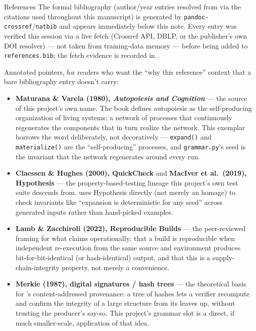 \documentclass[
  ignorenonframetext,
]{beamer}
\author{\texorpdfstring{}{}}
\date{}
\providecommand{\tightlist}{%
  \setlength{\itemsep}{0pt}\setlength{\parskip}{0pt}}
\begin{document}
\begin{frame}{References}
\protect{}\label{references}
The formal bibliography (author/year entries resolved from
 via the \texttt{\breakseq{[@citekey]}}
citations used throughout this manuscript) is generated by
\texttt{pandoc-crossref}/\texttt{natbib} and appears immediately below
this note. Every entry was verified this session via a live fetch
(Crossref API, DBLP, or the publisher's own DOI resolver) --- not taken
from training-data memory --- before being added to
\texttt{references.bib}; the fetch evidence is recorded in
.

Annotated pointers, for readers who want the ``why this reference''
context that a bare bibliography entry doesn't carry:

\begin{itemize}
\tightlist
\item
  \textbf{Maturana \& Varela (1980), \emph{Autopoiesis and Cognition}}
   --- the source of this project's own
  name. The book defines autopoiesis as the self-producing organization
  of living systems: a network of processes that continuously
  regenerates the components that in turn realize the network. This
  exemplar borrows the word deliberately, not decoratively ---
  \texttt{expand()} and \texttt{materialize()} are the
  ``self-producing'' processes, and \texttt{grammar.py}'s seed is the
  invariant that the network regenerates around every run.
\item
  \textbf{Claessen \& Hughes (2000), QuickCheck}
   and \textbf{MacIver et al.~(2019),
  Hypothesis}  --- the
  property-based-testing lineage this project's own test suite descends
  from.  uses Hypothesis
  directly (not merely an homage) to check invariants like ``expansion
  is deterministic for any seed'' across generated inputs rather than
  hand-picked examples.
\item
  \textbf{Lamb \& Zacchiroli (2022), Reproducible Builds}
   --- the peer-reviewed framing for what
   claims operationally: that
  a build is reproducible when independent re-execution from the same
  source and environment produces bit-for-bit-identical (or
  hash-identical) output, and that this is a supply-chain-integrity
  property, not merely a convenience.
\item
  \textbf{Merkle (1987), digital signatures / hash trees}
   --- the theoretical basis for
  's content-addressed provenance: a tree of
  hashes lets a verifier recompute and confirm the integrity of a large
  structure from its leaves up, without trusting the producer's say-so.
  This project's  grammar slot is a
  direct, if much smaller-scale, application of that idea.
\end{itemize}
\end{frame}
\end{document}
